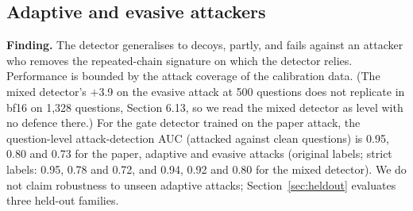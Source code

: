 \documentclass[preprint,12pt]{elsarticle}
\begin{document}
\subsection{Adaptive and evasive attackers}\label{sec:adaptive}
\begin{table}[tbp]
\centering\small
{}
\caption{Learned detector at the 2\% level against the adaptive and evasive attacks. No-defence F1 is 45.6 (adaptive) and 51.5 (evasive); original labels.}
\end{table}
\textbf{Finding.} The detector generalises to decoys, partly, and fails against an attacker who removes the repeated-chain signature on which the detector relies. Performance is bounded by the attack coverage of the calibration data. (The mixed detector's $+$3.9 on the evasive attack at 500 questions does not replicate in bf16 on 1,328 questions, Section 6.13, so we read the mixed detector as level with no defence there.) For the gate detector trained on the paper attack, the question-level attack-detection AUC (attacked against clean questions) is 0.95, 0.80 and 0.73 for the paper, adaptive and evasive attacks (original labels; strict labels: 0.95, 0.78 and 0.72, and 0.94, 0.92 and 0.80 for the mixed detector). We do not claim robustness to unseen adaptive attacks; Section~\ref{sec:heldout} evaluates three held-out families.
\end{document}
